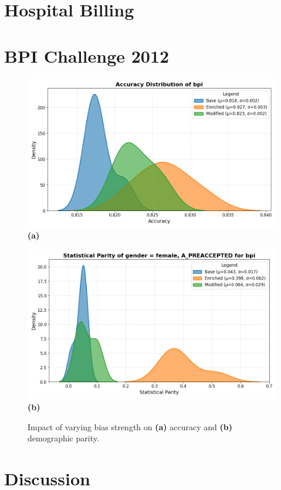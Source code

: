 \section{Hospital Billing}



\section{BPI Challenge 2012}

\begin{figure}[h!]
    \centering
    \begin{minipage}{0.49\textwidth}
        \centering
        \includegraphics[width=\textwidth]{gfx/bpi_accuracy.png}
        \textbf{(a)}
    \end{minipage}
    \hfill
    \begin{minipage}{0.49\textwidth}
        \centering
        \includegraphics[width=\textwidth]{gfx/bpi_fairness.png}
        \textbf{(b)}
    \end{minipage}
    \caption{Impact of varying bias strength on \textbf{(a)} accuracy and \textbf{(b)} demographic parity.}
    \label{fig:ablation_bias_results}
\end{figure}

\section{Discussion}
